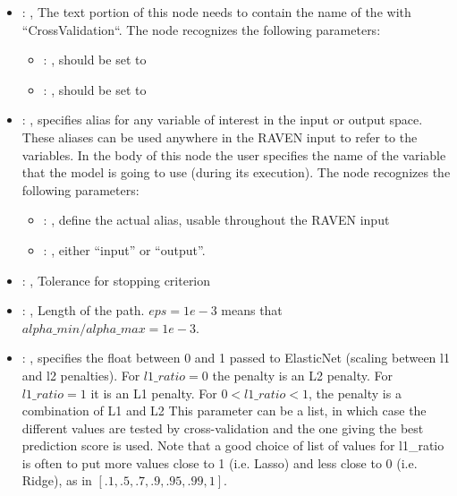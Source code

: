 \begin{itemize}
    \item {}: , 
      The text portion of this node needs to contain the name of the  with
               ``CrossValidation``.
      The  node recognizes the following parameters:
        \begin{itemize}
          \item {}: , 
            should be set to 
          \item {}: , 
            should be set to 
      \end{itemize}

    \item {}: , 
      specifies alias for         any variable of interest in the input or output space. These
      aliases can be used anywhere in the RAVEN input to         refer to the variables. In the body
      of this node the user specifies the name of the variable that the model is going to use
      (during its execution).
      The  node recognizes the following parameters:
        \begin{itemize}
          \item {}: , 
            define the actual alias, usable throughout the RAVEN input
          \item {}: , 
            either ``input'' or ``output''.
      \end{itemize}

    \item {}: , 
      Tolerance for stopping criterion

    \item {}: , 
      Length of the path. $eps=1e-3$ means that
      $alpha\_min / alpha\_max = 1e-3$.

    \item {}: , 
      specifies the                                                  float between 0 and 1 passed to
      ElasticNet (scaling between l1 and l2 penalties).
      For $l1\_ratio = 0$ the penalty is an L2 penalty. For $l1\_ratio = 1$ it is
      an L1 penalty. For $0 < l1\_ratio < 1$, the penalty is a combination of L1
      and L2 This parameter can be a list, in which case the different values
      are tested by cross-validation and the one giving the best prediction score
      is used. Note that a good choice of list of values for l1\_ratio is often to
      put more values close to 1 (i.e. Lasso) and less close to 0 (i.e. Ridge),
      as in $[.1, .5, .7, .9, .95, .99, 1]$.


\end{itemize}
